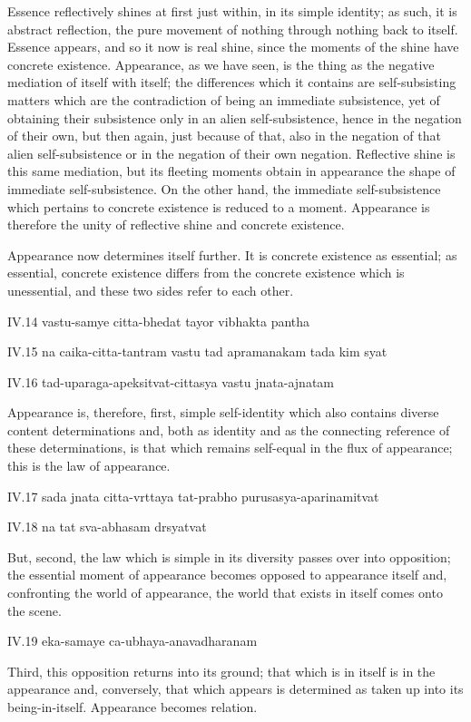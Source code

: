 Essence reflectively shines at first just within, in its simple identity;
as such, it is abstract reflection, the pure movement
of nothing through nothing back to itself.
Essence appears, and so it now is real shine,
since the moments of the shine have concrete existence.
Appearance, as we have seen, is the thing as
the negative mediation of itself with itself;
the differences which it contains are self-subsisting matters
which are the contradiction of being an immediate subsistence,
yet of obtaining their subsistence only in an alien self-subsistence,
hence in the negation of their own, but then again,
just because of that, also in the negation of that alien self-subsistence
or in the negation of their own negation.
Reflective shine is this same mediation,
but its fleeting moments obtain in appearance
the shape of immediate self-subsistence.
On the other hand, the immediate self-subsistence which
pertains to concrete existence is reduced to a moment.
Appearance is therefore the unity
of reflective shine and concrete existence.

Appearance now determines itself further.
It is concrete existence as essential;
as essential, concrete existence differs
from the concrete existence which is unessential,
and these two sides refer to each other.

IV.14
vastu-samye citta-bhedat tayor vibhakta pantha

IV.15
na caika-citta-tantram vastu tad apramanakam tada kim syat

IV.16
tad-uparaga-apeksitvat-cittasya vastu jnata-ajnatam

Appearance is, therefore, first, simple self-identity
which also contains diverse content determinations
and, both as identity and as the connecting reference
of these determinations,
is that which remains self-equal
in the flux of appearance;
this is the law of appearance.

IV.17
sada jnata citta-vrttaya tat-prabho purusasya-aparinamitvat

IV.18
na tat sva-abhasam drsyatvat

But, second, the law which is simple in its diversity
passes over into opposition;
the essential moment of appearance becomes
opposed to appearance itself
and, confronting the world of appearance,
the world that exists in itself comes onto the scene.

IV.19
eka-samaye ca-ubhaya-anavadharanam

Third, this opposition returns into its ground;
that which is in itself is in the appearance
and, conversely, that which appears is determined
as taken up into its being-in-itself.
Appearance becomes relation.

